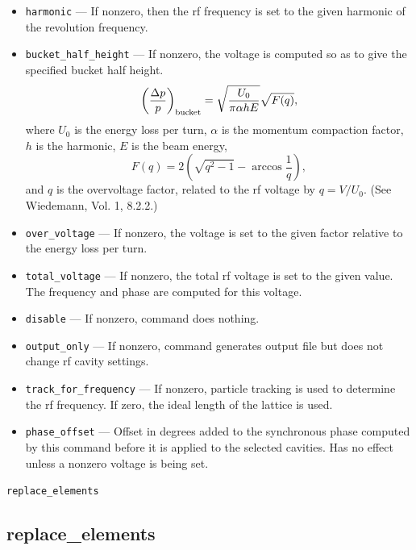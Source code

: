 \documentclass[11pt]{article}
\begin{document}
\begin{itemize}
  produces a substantial momentum offset.
\item \verb|harmonic| --- If nonzero, then the rf frequency is set to the given harmonic of the revolution
  frequency.
\item \verb|bucket_half_height| --- If nonzero, the voltage is computed so as to give the specified bucket
  half height. 
\begin{equation}
\left(\frac{\Delta p}{p}\right)_{\rm bucket} = \sqrt{\frac{U_0}{\pi \alpha h E}}\sqrt{F(q)},
\end{equation} 
where $U_0$ is the energy loss per turn, $\alpha$ is the momentum compaction factor, $h$ is the harmonic, 
$E$ is the beam energy, 
\begin{equation}
F(q) = 2 \left(\sqrt{q^2-1} - \arccos \frac{1}{q}\right),
\end{equation}
and $q$ is the overvoltage factor, related to the rf voltage by $q = V/U_0$. (See Wiedemann, Vol. 1, 8.2.2.)
\item \verb|over_voltage| --- If nonzero, the voltage is set to the given factor relative to the 
energy loss per turn.
\item \verb|total_voltage| --- If nonzero, the total rf voltage is set to the given value. The frequency and
  phase are computed for this voltage.
\item \verb|disable| --- If nonzero, command does nothing.
\item \verb|output_only| --- If nonzero, command generates output file but does not change rf cavity settings.
\item \verb|track_for_frequency| --- If nonzero, particle tracking is used to determine the rf frequency. If zero,
  the ideal length of the lattice is used.
\item \verb|phase_offset| --- Offset in degrees added to the synchronous phase computed by this
  command before it is applied to the selected cavities.  Has no effect unless a nonzero voltage is
  being set.
\end{itemize}

\newpage
\begin{center}{\Large\verb|replace_elements|}\end{center}
\subsection{replace\_elements \label{subsec:replaceelements}}
\end{document}
